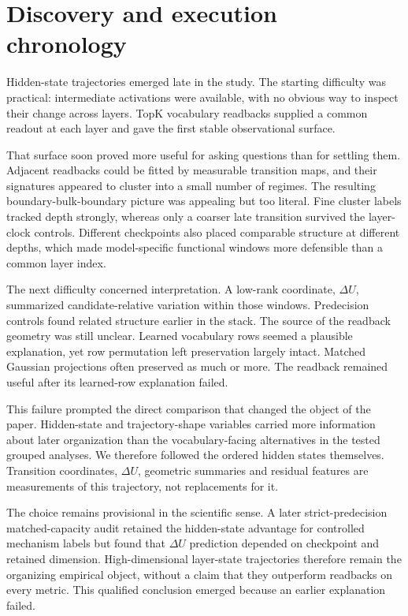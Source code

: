 \documentclass[11pt]{article}
\begin{document}
\clearpage
\appendix
\section{Discovery and execution chronology}
Hidden-state trajectories emerged late in the study. The starting difficulty was practical: intermediate activations were available, with no obvious way to inspect their change across layers. TopK vocabulary readbacks supplied a common readout at each layer and gave the first stable observational surface.

That surface soon proved more useful for asking questions than for settling them. Adjacent readbacks could be fitted by measurable transition maps, and their signatures appeared to cluster into a small number of regimes. The resulting boundary-bulk-boundary picture was appealing but too literal. Fine cluster labels tracked depth strongly, whereas only a coarser late transition survived the layer-clock controls. Different checkpoints also placed comparable structure at different depths, which made model-specific functional windows more defensible than a common layer index.

The next difficulty concerned interpretation. A low-rank coordinate, \(\Delta U\), summarized candidate-relative variation within those windows. Predecision controls found related structure earlier in the stack. The source of the readback geometry was still unclear. Learned vocabulary rows seemed a plausible explanation, yet row permutation left preservation largely intact. Matched Gaussian projections often preserved as much or more. The readback remained useful after its learned-row explanation failed.

This failure prompted the direct comparison that changed the object of the paper. Hidden-state and trajectory-shape variables carried more information about later organization than the vocabulary-facing alternatives in the tested grouped analyses. We therefore followed the ordered hidden states themselves. Transition coordinates, \(\Delta U\), geometric summaries and residual features are measurements of this trajectory, not replacements for it.

The choice remains provisional in the scientific sense. A later strict-predecision matched-capacity audit retained the hidden-state advantage for controlled mechanism labels but found that \(\Delta U\) prediction depended on checkpoint and retained dimension. High-dimensional layer-state trajectories therefore remain the organizing empirical object, without a claim that they outperform readbacks on every metric. This qualified conclusion emerged because an earlier explanation failed.
\end{document}
